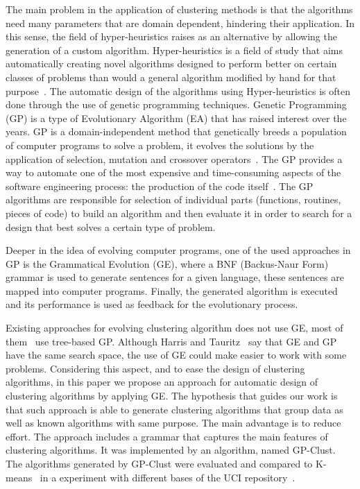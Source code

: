 \documentclass[conference]{IEEEtran}
\begin{document}
	
	The main problem in the application of clustering methods is that the algorithms need many parameters that are domain dependent, hindering their application. In this sense, the field of hyper-heuristics raises as an alternative by allowing the generation of a custom algorithm. Hyper-heuristics is a field of study that aims automatically creating novel algorithms designed to perform better on certain classes of problems than would a general algorithm modified by hand for that purpose~\cite{harris2015comparison}. The automatic design of the algorithms using Hyper-heuristics is  often done through the use of genetic programming techniques. Genetic Programming (GP) is a type of Evolutionary Algorithm (EA) that has raised interest over the years. GP is a domain-independent method that genetically breeds a population of computer programs to solve a problem, it evolves the solutions by the application of selection, mutation and crossover operators~\cite{poli2014genetic}. The GP provides a way to automate one of the most expensive and time-consuming aspects of the software engineering process: the production of the code itself~\cite{langdon2015optimising}. The GP algorithms are responsible for selection of individual parts (functions, routines, pieces of code) to build an algorithm and then evaluate it in order to search for a design that best solves a certain type of problem.
	
	
	Deeper in the idea of evolving computer programs, one of the used approaches in GP is the Grammatical Evolution (GE), where a BNF (Backus-Naur Form) grammar is used to generate sentences for a given language, these sentences are mapped into  computer programs. Finally, the generated algorithm is executed and its performance is used as feedback for the evolutionary process.
	
	
	Existing approaches for evolving clustering algorithm does not use GE, most of them~\cite{ahn2011genetic, boric2007genetic, xie2006population} use tree-based GP. Although Harris and Tauritz~\cite{harris2015comparison} say that GE and GP have the same search space,  the use of GE could make easier to work with some problems. Considering this aspect, and to ease the design of clustering algorithms, in this paper we propose an approach for automatic design of clustering algorithms by applying GE. The hypothesis that guides our work is that such approach is able to generate clustering algorithms that group data as well as known algorithms with same purpose. The main advantage is to reduce effort. The approach includes a grammar that captures the main features of  clustering algorithms. It was implemented by an algorithm, named GP-Clust. The algorithms generated by GP-Clust were evaluated and compared to K-means~\cite{kanungo2002efficient} in a experiment with different bases of the UCI repository~\cite{uci}. 
	
\end{document}
